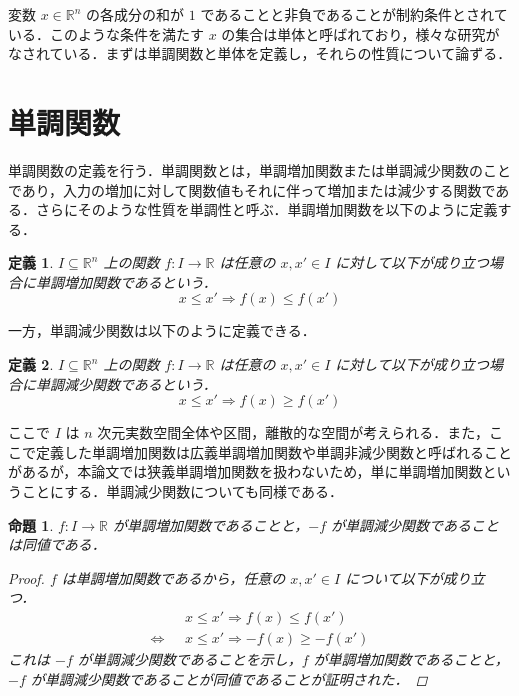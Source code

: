 \documentclass[a4paper,11pt]{jreport}
\newtheorem{definition}{定義}
\newtheorem{proposition}{命題}
\begin{document}
変数 $ x \in \mathbb{R}^n $ の各成分の和が $ 1 $ であることと非負であることが制約条件とされている．このような条件を満たす $ x $ の集合は単体と呼ばれており，様々な研究がなされている．まずは単調関数と単体を定義し，それらの性質について論ずる．\par

\section{単調関数}

単調関数の定義を行う．単調関数とは，単調増加関数または単調減少関数のことであり，入力の増加に対して関数値もそれに伴って増加または減少する関数である．さらにそのような性質を単調性と呼ぶ．単調増加関数を以下のように定義する．

\begin{definition}
$ I \subseteq \mathbb{R}^n $ 上の関数 $ f : I \to \mathbb{R} $ は任意の $ x, x' \in I $ に対して以下が成り立つ場合に単調増加関数であるという．
$$ x \leq x' \Rightarrow f(x) \leq f(x') $$
\end{definition}

一方，単調減少関数は以下のように定義できる．

\begin{definition}
$ I \subseteq \mathbb{R}^n $ 上の関数 $ f : I \to \mathbb{R} $ は任意の $ x, x' \in I $ に対して以下が成り立つ場合に単調減少関数であるという．
$$ x \leq x' \Rightarrow f(x) \geq f(x') $$
\end{definition}

ここで $ I $ は $ n $ 次元実数空間全体や区間，離散的な空間が考えられる．また，ここで定義した単調増加関数は広義単調増加関数や単調非減少関数と呼ばれることがあるが，本論文では狭義単調増加関数を扱わないため，単に単調増加関数ということにする．単調減少関数についても同様である．

\begin{proposition} \label{prop:keeping_monotonicity}
$ f : I \to \mathbb{R} $ が単調増加関数であることと，$ -f $ が単調減少関数であることは同値である．

\begin{proof}
$ f $ は単調増加関数であるから，任意の $ x, x' \in I $ について以下が成り立つ．
\begin{align*}
& x \leq x' \Rightarrow f(x) \leq f(x') \\
\Longleftrightarrow \hspace{8pt} & x \leq x' \Rightarrow -f(x) \geq -f(x')
\end{align*}
これは $ -f $ が単調減少関数であることを示し，$ f $ が単調増加関数であることと，$ -f $ が単調減少関数であることが同値であることが証明された．
\end{proof}

\end{proposition}
\end{document}

